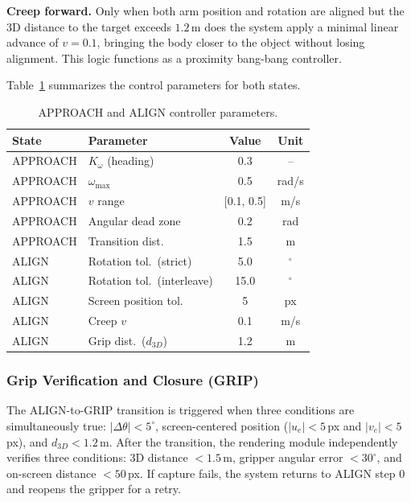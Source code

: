 \documentclass[10pt,twocolumn,letterpaper]{article}
\begin{document}
\textbf{Creep forward.} Only when both arm position and rotation are aligned but the 3D distance to the target exceeds $1.2$\,m does the system apply a minimal linear advance of $v = 0.1$, bringing the body closer to the object without losing alignment. This logic functions as a proximity bang-bang controller.

Table~\ref{tab:control_params} summarizes the control parameters for both states.

\begin{table}[H]
\centering
\caption{APPROACH and ALIGN controller parameters.}
\label{tab:control_params}
\scriptsize
\begin{tabular}{@{}llcc@{}}
\toprule
\textbf{State} & \textbf{Parameter} & \textbf{Value} & \textbf{Unit} \\
\midrule
APPROACH & $K_\omega$ (heading) & 0.3 & -- \\
APPROACH & $\omega_{\max}$ & 0.5 & rad/s \\
APPROACH & $v$ range & [0.1, 0.5] & m/s \\
APPROACH & Angular dead zone & 0.2 & rad \\
APPROACH & Transition dist. & 1.5 & m \\
\midrule
ALIGN & Rotation tol.\ (strict) & 5.0 & $^{\circ}$ \\
ALIGN & Rotation tol.\ (interleave) & 15.0 & $^{\circ}$ \\
ALIGN & Screen position tol. & 5 & px \\
ALIGN & Creep $v$ & 0.1 & m/s \\
ALIGN & Grip dist.\ ($d_{3D}$) & 1.2 & m \\
\bottomrule
\end{tabular}
\end{table}

\subsubsection{Grip Verification and Closure (GRIP)}

The ALIGN-to-GRIP transition is triggered when three conditions are simultaneously true: $|\Delta\theta| < 5^{\circ}$, screen-centered position ($|u_e| < 5$\,px and $|v_e| < 5$\,px), and $d_{3D} < 1.2$\,m. After the transition, the rendering module independently verifies three conditions: 3D distance $< 1.5$\,m, gripper angular error $< 30^{\circ}$, and on-screen distance $< 50$\,px. If capture fails, the system returns to ALIGN step 0 and reopens the gripper for a retry.
\end{document}
